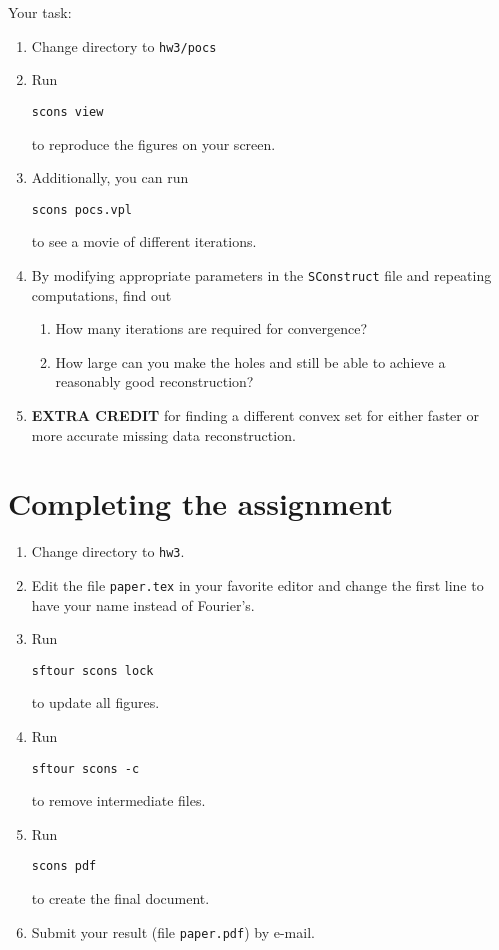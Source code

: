 Your task:
\begin{enumerate}
\item Change directory to \texttt{hw3/pocs}
\item Run 
\begin{verbatim}
scons view
\end{verbatim}
to reproduce the figures on your screen.
\item Additionally, you can run
\begin{verbatim}
scons pocs.vpl
\end{verbatim}
to see a movie of different iterations.
\item By modifying appropriate parameters in the \texttt{SConstruct} file and repeating computations,
find out
\begin{enumerate}
\item How many iterations are required for convergence?
\item How large can you make the holes and still be able to achieve a reasonably good reconstruction?
\end{enumerate}
\item \textbf{EXTRA CREDIT} for finding a different convex set for either faster or more accurate missing data reconstruction.
\end{enumerate}

\newpage

\section{Completing the assignment}

\begin{enumerate}
\item Change directory to \texttt{hw3}.
\item Edit the file \texttt{paper.tex} in your favorite editor and change the
  first line to have your name instead of Fourier's.
\item Run
\begin{verbatim}
sftour scons lock
\end{verbatim}
to update all figures.
\item Run
\begin{verbatim}
sftour scons -c
\end{verbatim}
to remove intermediate files.
\item Run
\begin{verbatim}
scons pdf
\end{verbatim}
to create the final document.
\item Submit your result (file \texttt{paper.pdf}) by e-mail.
\end{enumerate}



